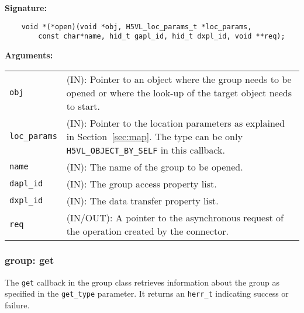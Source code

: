 \begin{mdframed}[style=bgbox]
\textbf{Signature:}
\begin{lstlisting}
    void *(*open)(void *obj, H5VL_loc_params_t *loc_params, 
        const char*name, hid_t gapl_id, hid_t dxpl_id, void **req);
\end{lstlisting}

\textbf{Arguments:}\\
\begin{tabular}{l p{13.5cm}}
  \texttt{obj} & (IN): Pointer to an object where the group needs to be
  opened or where the look-up of the target object needs to start.\\
  \texttt{loc\_params} & (IN): Pointer to the location parameters as explained in
  Section~\ref{sec:map}. The type can be only \texttt{H5VL\_OBJECT\_BY\_SELF} in this callback. \\
  \texttt{name} & (IN): The name of the group to be opened.\\
  \texttt{dapl\_id} & (IN): The group access property list.\\
  \texttt{dxpl\_id} & (IN): The data transfer property list.\\
  \texttt{req} & (IN/OUT): A pointer to the asynchronous request of the
  operation created by the connector.\\
\end{tabular}
\end{mdframed}

\subsubsection{group: get}
The \texttt{get} callback in the group class retrieves information
about the group as specified in the \texttt{get\_type} parameter. It
returns an \texttt{herr\_t} indicating success or failure.\bigskip

